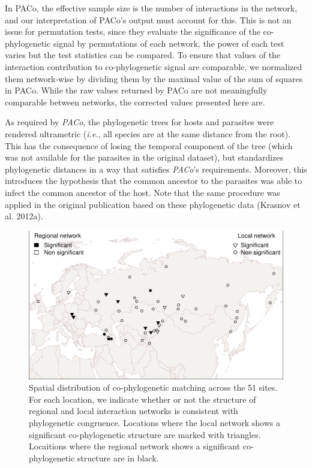 \documentclass[11pt,serif]{article}
\begin{document}
In PACo, the effective sample size is the number of interactions in the
network, and our interpretation of PACo's output must account for this.
This is not an issue for permutation tests, since they evaluate the
significance of the co-phylogenetic signal by permutations of each
network, the power of each test varies but the test statistics can be
compared. To ensure that values of the interaction contribution to
co-phylogenetic signal are comparable, we normalized them network-wise
by dividing them by the maximal value of the sum of squares in PACo.
While the raw values returned by PACo are not meaningfully comparable
between networks, the corrected values presented here are.

As required by \emph{PACo}, the phylogenetic trees for hosts and
parasites were rendered ultrametric (\emph{i.e.}, all species are at the
same distance from the root). This has the consequence of losing the
temporal component of the tree (which was not available for the
parasites in the original dataset), but standardizes phylogenetic
distances in a way that satisfies \emph{PACo}'s requirements. Moreover,
this introduces the hypothesis that the common ancestor to the parasites
was able to infect the common ancestor of the host. Note that the same
procedure was applied in the original publication based on these
phylogenetic data (Krasnov et al. 2012a).

\begin{figure}[htbp]
\centering
\includegraphics[width=1.00000\textwidth]{figure/maps-1.pdf}
\caption{Spatial distribution of co-phylogenetic matching across the 51
sites. For each location, we indicate whether or not the structure of
regional and local interaction networks is consistent with phylogenetic
congruence. Locations where the local network shows a significant
co-phylogenetic structure are marked with triangles. Locaitions where
the regional network shows a significant co-phylogenetic structure are
in black.\label{fig:maps}}
\end{figure}
\end{document}
